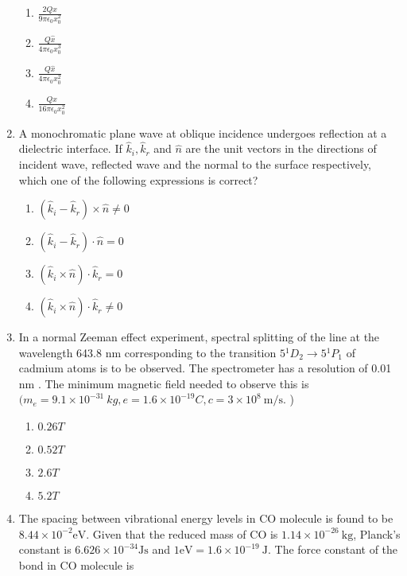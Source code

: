 \documentclass[journal]{IEEEtran}
\begin{document}
\begin{enumerate}
\begin{multicols}{4}
\begin{enumerate}
\item  $\frac{2 Q \hat{x}}{9 \pi \epsilon_{0} x_{0}^{2}}$
\item  $\frac{Q \hat{x}}{4 \pi \epsilon_{0} x_{0}^{3}}$
\item  $\frac{{Q} \hat{x}}{4 \pi \epsilon_{0} x_{0}^{2}}$
\item  $\frac{{Q} \hat{{x}}}{16 \pi \epsilon_{0} x_{0}^{2}}$
   \end{enumerate}
		\end{multicols}
  \item   A monochromatic plane wave at oblique incidence undergoes reflection at a dielectric interface. If $\hat{k}_{i}, \hat{k}_{r}$ and $\hat{n}$ are the unit vectors in the directions of incident wave, reflected wave and the normal to the surface respectively, which one of the following expressions is correct?
  \begin{multicols}{4}
			\begin{enumerate}
   \item$(\hat{k}_{i}-\hat{k}_{r}) \times \hat{n} \neq 0$
\item $(\hat{k}_{i}-\hat{k}_{r}) \cdot \hat{n}=0$
\item  $(\hat{k}_{i} \times \hat{n}) \cdot \hat{k}_{r}=0$
\item $(\hat{k}_{i} \times \hat{n}) \cdot \hat{k}_{r} \neq 0$
 \end{enumerate}
		\end{multicols}
  \item  In a normal Zeeman effect experiment, spectral splitting of the line at the wavelength 643.8 nm corresponding to the transition $5{ }^{1} D_{2} \rightarrow 5{ }^{1} P_{1}$ of cadmium atoms is to be observed. The spectrometer has a resolution of 0.01 nm . The minimum magnetic field needed to observe this is $(m_{e}=9.1 \times 10^{-31} {~kg}, e=1.6 \times 10^{-19} {C}, c=3 \times 10^{8} \mathrm{~m} / \mathrm{s}.$ )
 
			\begin{enumerate}
   \item $0.26 T$
\item  $0.52 T$
\item $2.6 T$
\item$5.2 T$
 \end{enumerate}
	
  \item The spacing between vibrational energy levels in CO molecule is found to be $8.44 \times 10^{-2} \mathrm{eV}$. Given that the reduced mass of CO is $1.14 \times 10^{-26} \mathrm{~kg}$, Planck's constant is $6.626 \times 10^{-34} \mathrm{Js}$ and $1 \mathrm{eV}=1.6 \times 10^{-19} \mathrm{~J}$. The force constant of the bond in CO molecule is
  


\end{enumerate}
\end{document}
